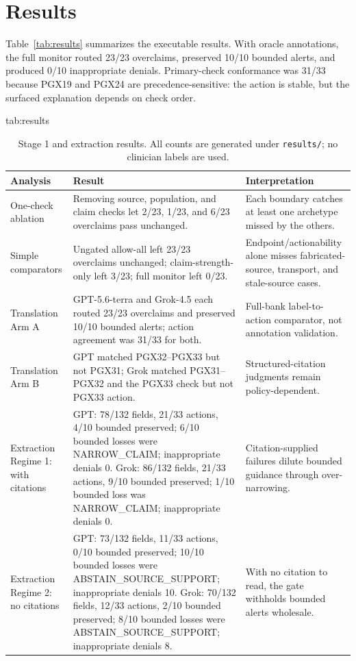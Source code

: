 \documentclass[pmlr,twocolumn,10pt]{jmlr}
\begin{document}
\section{Results}
Table~\ref{tab:results} summarizes the executable results.
With oracle annotations, the full monitor routed 23/23 overclaims, preserved 10/10 bounded alerts, and produced 0/10 inappropriate denials.
Primary-check conformance was 31/33 because PGX19 and PGX24 are precedence-sensitive: the action is stable, but the surfaced explanation depends on check order.

\begin{table}[tbp]
\floatconts
  {tab:results}
  {\caption{Stage 1 and extraction results. All counts are generated under \texttt{results/}; no clinician labels are used.}}
  {\footnotesize\begin{tabular}{@{}>{\raggedright\arraybackslash}p{}>{\raggedright\arraybackslash}p{}>{\raggedright\arraybackslash}p{}@{}}
  \toprule
  Analysis & Result & Interpretation \\
  \midrule
  One-check ablation & Removing source, population, and claim checks let 2/23, 1/23, and 6/23 overclaims pass unchanged. & Each boundary catches at least one archetype missed by the others. \\
  Simple comparators & Ungated allow-all left 23/23 overclaims unchanged; claim-strength-only left 3/23; full monitor left 0/23. & Endpoint/actionability alone misses fabricated-source, transport, and stale-source cases. \\
  Translation Arm A & GPT-5.6-terra and Grok-4.5 each routed 23/23 overclaims and preserved 10/10 bounded alerts; action agreement was 31/33 for both. & Full-bank label-to-action comparator, not annotation validation. \\
  Translation Arm B & GPT matched PGX32--PGX33 but not PGX31; Grok matched PGX31--PGX32 and the PGX33 check but not PGX33 action. & Structured-citation judgments remain policy-dependent. \\
  Extraction Regime 1: with citations & GPT: 78/132 fields, 21/33 actions, 4/10 bounded preserved; 6/10 bounded losses were NARROW\_CLAIM; inappropriate denials 0. Grok: 86/132 fields, 21/33 actions, 9/10 bounded preserved; 1/10 bounded loss was NARROW\_CLAIM; inappropriate denials 0. & Citation-supplied failures dilute bounded guidance through over-narrowing. \\
  Extraction Regime 2: no citations & GPT: 73/132 fields, 11/33 actions, 0/10 bounded preserved; 10/10 bounded losses were ABSTAIN\_SOURCE\_SUPPORT; inappropriate denials 10. Grok: 70/132 fields, 12/33 actions, 2/10 bounded preserved; 8/10 bounded losses were ABSTAIN\_SOURCE\_SUPPORT; inappropriate denials 8. & With no citation to read, the gate withholds bounded alerts wholesale. \\

\end{tabular}}
\end{table}
\end{document}
